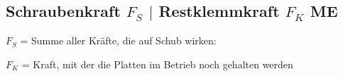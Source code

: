 \subsection{Schraubenkraft $F_S$ $\mid$ Restklemmkraft $F_K$ \hfill ME}
\begin{footnotesize}
    \begin{itemize}
        \scriptsize{\item $F_S$ = Summe aller Kräfte, die auf Schub wirken: }
        \vspace{-2mm}  
        \vspace{-3mm}
        \scriptsize{\item $F_K$ = Kraft, mit der die Platten im Betrieb noch gehalten werden}
        \vspace{-2mm}
    \end{itemize}
\end{footnotesize}